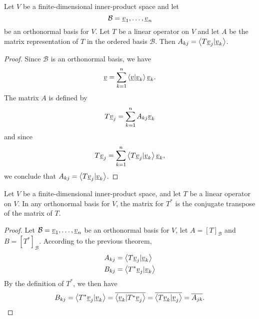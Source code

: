 \begin{theorem}
Let $V$ be a finite-dimensional inner-product space and let
\begin{equation*}
\mathcal{B} = \underline{v}_1, \ldots, \underline{v}_n
\end{equation*}
be an orthonormal basis for $V$.
Let $T$ be a linear operator on $V$ and let $A$ be the matrix representation of $T$ in the ordered basis $\mathcal{B}$.
Then $A_{kj} = \left\langle T \underline{v}_j | \underline{v}_k \right\rangle$.
\end{theorem}
\begin{proof}
Since $\mathcal{B}$ is an orthonormal basis, we have
\begin{equation*}
\underline{v} = \sum_{k=1}^n \left\langle \underline{v} | \underline{v}_k \right\rangle \underline{v}_k .
\end{equation*}
The matrix $A$ is defined by
\begin{equation*}
T \underline{v}_j = \sum_{k=1}^n A_{kj} \underline{v}_k
\end{equation*}
and since
\begin{equation*}
T \underline{v}_j = \sum_{k=1}^n \left\langle T \underline{v}_j | \underline{v}_k \right\rangle \underline{v}_k ,
\end{equation*}
we conclude that $A_{kj} = \left\langle T \underline{v}_j | \underline{v}_k \right\rangle$.
\end{proof}

\begin{corollary}
Let $V$ be a finite-dimensional inner-product space, and let $T$ be a linear operator on $V$.
In any orthonormal basis for $V$, the matrix for $T^*$ is the conjugate transpose of the matrix of $T$.
\end{corollary}
\begin{proof}
Let $\mathcal{B} = \underline{v}_1, \ldots, \underline{v}_n$ be an orthonormal basis for $V$, let $A = [T]_{\mathcal{B}}$ and $B = [T^*]_{\mathcal{B}}$.
According to the previous theorem,
\begin{align*}
A_{kj} &= \left\langle T \underline{v}_j | \underline{v}_k \right\rangle \\
B_{kj} &= \left\langle T^* \underline{v}_j | \underline{v}_k \right\rangle
\end{align*}
By the definition of $T^*$, we then have
\begin{equation*}
B_{kj} = \left\langle T^* \underline{v}_j | \underline{v}_k \right\rangle
= \overline{\left\langle \underline{v}_k | T^* \underline{v}_j \right\rangle}
= \overline{\left\langle T \underline{v}_k | \underline{v}_j \right\rangle}
= \overline{A_{jk}} .
\end{equation*}
\end{proof}


